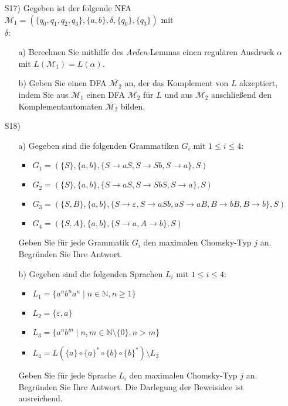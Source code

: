
\begin{exercise}

\begin{enumerate}
\item[S17)] Gegeben ist der folgende NFA $\mathcal{M}_1=(\{q_0,q_1,q_2,q_3\},\{a,b\},\delta,\{q_0\},\{q_3\})$ mit\\[0.2cm] 
$\delta$:
\begin{center}
  
\end{center}
\begin{enumerate}
    \item[a)] Berechnen Sie mithilfe des {\it{Arden}}-Lemmas einen regul\"aren Ausdruck $\alpha$ mit $L(\mathcal{M}_1)=L(\alpha)$.
    \item[b)] Geben Sie einen DFA $\overline{\mathcal{M}_2}$ an, der das Komplement von $L$ akzeptiert, indem Sie aus ${\mathcal{M}}_1$ einen DFA ${\mathcal{M}}_2$
       f\"ur $L$ und aus ${\mathcal{M}}_2$ anschlie\ss{}end den Komplementautomaten $\overline{\mathcal{M}_2}$ bilden.\\
 \end{enumerate} 
  
\item[S18)]  
\begin{enumerate}
  \item[a)] Gegeben sind die folgenden Grammatiken $G_i$ mit $1\le i\le 4$:
    \begin{itemize}
      \item $G_1=(\{S\},\{a,b\},\{S\rightarrow aS,S\rightarrow Sb,S\rightarrow a\},S)$
      \item $G_2=(\{S\},\{a,b\},\{S\rightarrow aS,S\rightarrow SbS,S\rightarrow a\},S)$
      \item $G_3=(\{S,B\},\{a,b\},\{S\rightarrow \varepsilon,S\rightarrow aSb,aS\rightarrow aB, B\rightarrow bB, B\rightarrow b\},S)$
      \item $G_4=(\{S,A\},\{a,b\},\{S\rightarrow a,A\rightarrow b\},S)$ 
    \end{itemize}
   Geben Sie f\"ur jede Grammatik $G_i$ den maximalen Chomsky-Typ $j$ an. Begr\"unden Sie Ihre Antwort.
   \item[b)] Gegeben sind die folgenden Sprachen $L_i$ mit $1\le i\le 4$:
 \begin{itemize}
      \item $L_1=\{a^nb^na^n \;|\;n\in \mathbb{N}, n\ge 1\}$   
      \item $L_2=\{\varepsilon,a\}$   
      \item $L_3=\{a^nb^m \;|\;n,m\in \mathbb{N}\setminus \{0\}, n> m\}$   
      \item $L_4=L(\{a\}\circ \{a\}^*\circ \{b\}\circ \{b\}^*)\setminus L_3$   
 \end{itemize}
 Geben Sie f\"ur jede Sprache $L_i$ den maximalen Chomsky-Typ $j$ an. Begr\"unden Sie Ihre Antwort. Die Darlegung der Beweisidee ist ausreichend.
 \end{enumerate}
 
 \end{enumerate}
 
 \end{exercise}
 
 